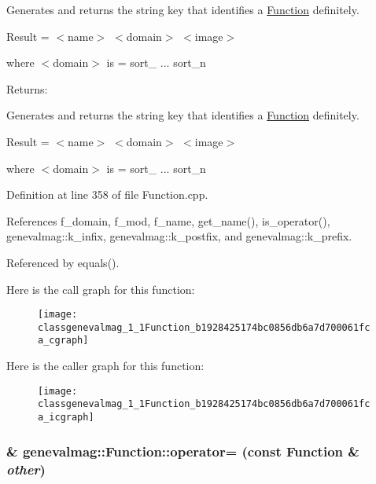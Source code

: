 Generates and returns the string key that identifies a \hyperlink{classgenevalmag_1_1Function}{Function} definitely.\par
 \par
 Result = $<$name$>$ $<$domain$>$ $<$image$>$\par
 \par
 where $<$domain$>$ is = sort\_ ... sort\_\-n\par
 \begin{Desc}
\item[Returns:]\end{Desc}
Generates and returns the string key that identifies a \hyperlink{classgenevalmag_1_1Function}{Function} definitely.

Result = $<$name$>$ $<$domain$>$ $<$image$>$

where $<$domain$>$ is = sort\_ ... sort\_\-n 

Definition at line 358 of file Function.cpp.

References f\_\-domain, f\_\-mod, f\_\-name, get\_\-name(), is\_\-operator(), genevalmag::k\_\-infix, genevalmag::k\_\-postfix, and genevalmag::k\_\-prefix.

Referenced by equals().

Here is the call graph for this function:\nopagebreak
\begin{figure}[H]
\begin{center}
\leavevmode
\texttt{[image: classgenevalmag\_1\_1Function\_b1928425174bc0856db6a7d700061fca\_cgraph]}
\end{center}
\end{figure}


Here is the caller graph for this function:\nopagebreak
\begin{figure}[H]
\begin{center}
\leavevmode
\texttt{[image: classgenevalmag\_1\_1Function\_b1928425174bc0856db6a7d700061fca\_icgraph]}
\end{center}
\end{figure}
\hypertarget{classgenevalmag_1_1Function_917f09b6aa99038bcae21de7e9e99ad1}{
\subsubsection[{operator=}]{ \& genevalmag::Function::operator= (const {\bf Function} \& {\em other})}}
\label{classgenevalmag_1_1Function_917f09b6aa99038bcae21de7e9e99ad1}


